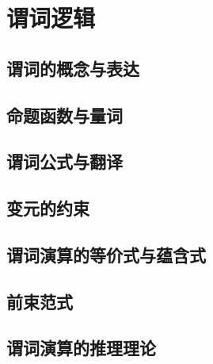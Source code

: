 \section{谓词逻辑}

\subsection{谓词的概念与表达}

\subsection{命题函数与量词}

\subsection{谓词公式与翻译}

\subsection{变元的约束}

\subsection{谓词演算的等价式与蕴含式}

\subsection{前束范式}

\subsection{谓词演算的推理理论}

